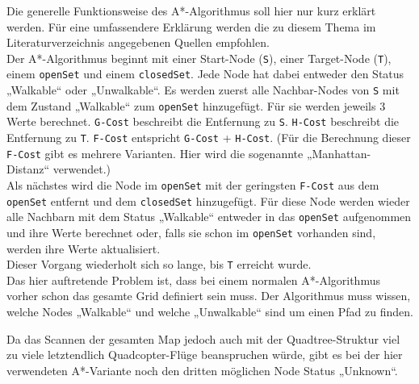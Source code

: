 \documentclass[a4paper,12pt]{article}
\newcommand{\code}{\texttt}
\begin{document}
Die generelle Funktionsweise des A*-Algorithmus soll hier nur kurz erklärt werden. Für eine umfassendere Erklärung werden die zu diesem Thema im Literaturverzeichnis angegebenen Quellen empfohlen.
\\[0.4cm]
Der A*-Algorithmus beginnt mit einer Start-Node (\code{S}), einer Target-Node (\code{T}), einem \code{openSet} und einem \code{closedSet}. Jede Node hat dabei entweder den Status „Walkable“ oder „Unwalkable“. Es werden zuerst alle Nachbar-Nodes von \code{S} mit dem Zustand „Walkable“ zum \code{openSet} hinzugefügt. Für sie werden jeweils 3 Werte berechnet. \code{G-Cost} beschreibt die Entfernung zu \code{S}. \code{H-Cost} beschreibt die Entfernung zu \code{T}. \code{F-Cost} entspricht \code{G-Cost} + \code{H-Cost}. (Für die Berechnung dieser \code{F-Cost} gibt es mehrere Varianten. Hier wird die sogenannte „Manhattan-Distanz“ verwendet.)
\\[0.4cm]
Als nächstes wird die Node im \code{openSet} mit der geringsten \code{F-Cost} aus dem \code{openSet} entfernt und dem \code{closedSet} hinzugefügt. Für diese Node werden wieder alle Nachbarn mit dem Status „Walkable“ entweder in das \code{openSet} aufgenommen und ihre Werte berechnet oder, falls sie schon im \code{openSet} vorhanden sind, werden ihre Werte aktualisiert.
\\[0.4cm]
Dieser Vorgang wiederholt sich so lange, bis \code{T} erreicht wurde.
\\[0.4cm]
Das hier auftretende Problem ist, dass bei einem normalen A*-Algorithmus vorher schon das gesamte Grid definiert sein muss. Der Algorithmus muss wissen, welche Nodes „Walkable“ und welche „Unwalkable“ sind um einen Pfad zu finden.

Da das Scannen der gesamten Map jedoch auch mit der Quadtree-Struktur viel zu viele letztendlich Quadcopter-Flüge beanspruchen würde, gibt es bei der hier verwendeten A*-Variante noch den dritten möglichen Node Status „Unknown“.
\end{document}
